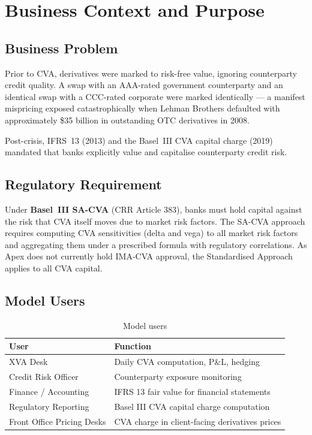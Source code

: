 \documentclass[11pt,a4paper]{article}
\begin{document}
\section{Business Context and Purpose}

\subsection{Business Problem}

Prior to CVA, derivatives were marked to risk-free value, ignoring
counterparty credit quality. A swap with an AAA-rated government counterparty
and an identical swap with a CCC-rated corporate were marked identically ---
a manifest mispricing exposed catastrophically when Lehman Brothers defaulted
with approximately \$35 billion in outstanding OTC derivatives in 2008.

Post-crisis, IFRS~13 (2013) and the Basel~III CVA capital charge (2019)
mandated that banks explicitly value and capitalise counterparty credit risk.

\subsection{Regulatory Requirement}

Under \textbf{Basel~III SA-CVA} (CRR Article 383), banks must hold capital
against the risk that CVA itself moves due to market risk factors. The SA-CVA
approach requires computing CVA sensitivities (delta and vega) to all market
risk factors and aggregating them under a prescribed formula with regulatory
correlations. As Apex does not currently hold IMA-CVA approval, the
Standardised Approach applies to all CVA capital.

\subsection{Model Users}

\begin{table}[h!]
\centering
\begin{tabular}{@{}ll@{}}
\toprule
\textbf{User} & \textbf{Function} \\
\midrule
XVA Desk                   & Daily CVA computation, P\&L, hedging \\
Credit Risk Officer        & Counterparty exposure monitoring \\
Finance / Accounting       & IFRS 13 fair value for financial statements \\
Regulatory Reporting       & Basel III CVA capital charge computation \\
Front Office Pricing Desks & CVA charge in client-facing derivatives prices \\
\bottomrule
\end{tabular}
\caption{Model users}
\end{table}
\end{document}
